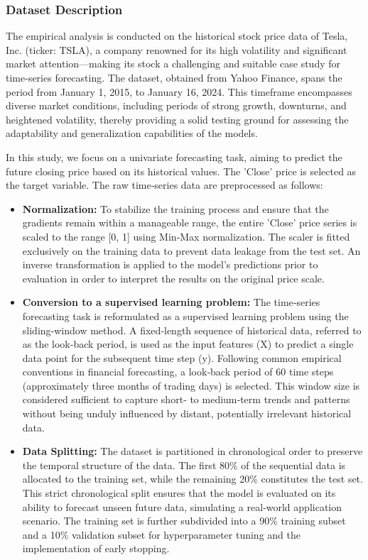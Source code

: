 \documentclass{cys}
\begin{document}
\begin{enumerate}

\subsubsection{Dataset Description}

    The empirical analysis is conducted on the historical stock price data of Tesla, Inc. (ticker: TSLA), a company renowned for its high volatility and significant market attention—making its stock a challenging and suitable case study for time‑series forecasting. The dataset, obtained from Yahoo Finance, spans the period from January 1, 2015, to January 16, 2024. This timeframe encompasses diverse market conditions, including periods of strong growth, downturns, and heightened volatility, thereby providing a solid testing ground for assessing the adaptability and generalization capabilities of the models.

    In this study, we focus on a univariate forecasting task, aiming to predict the future closing price based on its historical values. The 'Close' price is selected as the target variable. The raw time‑series data are preprocessed as follows:
    \begin{itemize}
        \item \textbf{Normalization:}
        To stabilize the training process and ensure that the gradients remain within a manageable range, the entire 'Close' price series is scaled to the range [0, 1] using Min‑Max normalization. The scaler is fitted exclusively on the training data to prevent data leakage from the test set. An inverse transformation is applied to the model's predictions prior to evaluation in order to interpret the results on the original price scale.
        \item \textbf{Conversion to a supervised learning problem:}
        The time‑series forecasting task is reformulated as a supervised learning problem using the sliding‑window method. A fixed‑length sequence of historical data, referred to as the look‑back period, is used as the input features (X) to predict a single data point for the subsequent time step (y). Following common empirical conventions in financial forecasting, a look‑back period of 60 time steps (approximately three months of trading days) is selected. This window size is considered sufficient to capture short‑ to medium‑term trends and patterns without being unduly influenced by distant, potentially irrelevant historical data.
        \item \textbf{Data Splitting:}
        The dataset is partitioned in chronological order to preserve the temporal structure of the data. The first 80\% of the sequential data is allocated to the training set, while the remaining 20\% constitutes the test set. This strict chronological split ensures that the model is evaluated on its ability to forecast unseen future data, simulating a real‑world application scenario. The training set is further subdivided into a 90\% training subset and a 10\% validation subset for hyperparameter tuning and the implementation of early stopping.
    \end{itemize}


\end{enumerate}
\end{document}
